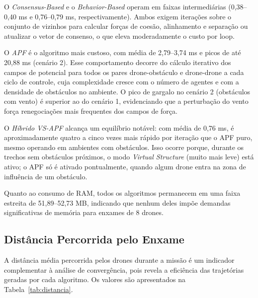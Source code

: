 O \textit{Consensus-Based} e o \textit{Behavior-Based} operam em faixas intermediárias (0,38--0,40 ms e 0,76--0,79 ms, respectivamente). Ambos exigem iterações sobre o conjunto de vizinhos para calcular forças de coesão, alinhamento e separação ou atualizar o vetor de consenso, o que eleva moderadamente o custo por loop.

O \textit{APF} é o algoritmo mais custoso, com média de 2,79--3,74 ms e picos de até 20,88 ms (cenário 2). Esse comportamento decorre do cálculo iterativo dos campos de potencial para todos os pares drone-obstáculo e drone-drone a cada ciclo de controle, cuja complexidade cresce com o número de agentes e com a densidade de obstáculos no ambiente. O pico de gargalo no cenário 2 (obstáculos com vento) é superior ao do cenário 1, evidenciando que a perturbação do vento força renegociações mais frequentes dos campos de força.

O \textit{Híbrido VS-APF} alcança um equilíbrio notável: com média de 0,76 ms, é aproximadamente quatro a cinco vezes mais rápido por iteração que o APF puro, mesmo operando em ambientes com obstáculos. Isso ocorre porque, durante os trechos sem obstáculos próximos, o modo \textit{Virtual Structure} (muito mais leve) está ativo; o APF só é ativado pontualmente, quando algum drone entra na zona de influência de um obstáculo.

Quanto ao consumo de RAM, todos os algoritmos permanecem em uma faixa estreita de 51,89--52,73 MB, indicando que nenhum deles impõe demandas significativas de memória para enxames de 8 drones.

\subsection{Distância Percorrida pelo Enxame}

A distância média percorrida pelos drones durante a missão é um indicador complementar à análise de convergência, pois revela a eficiência das trajetórias geradas por cada algoritmo. Os valores são apresentados na Tabela~\ref{tab:distancia}.

